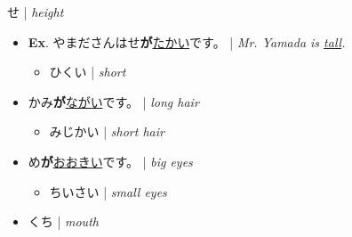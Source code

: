 \documentclass{article}
\begin{document}
\begin{CJK}{UTF8}{min}
せ | \textit{height}

\begin{itemize}
\item \textbf{Ex}. やまださんはせ\textbf{が}\uline{たかい}です。 | \textit{Mr. Yamada is \uline{tall}.}
\begin{itemize}
\item ひくい | \textit{short}
\end{itemize}
\item かみ\textbf{が}\uline{ながい}です。 | \textit{long hair}
\begin{itemize}
\item みじかい | \textit{short hair}
\end{itemize}
\item め\textbf{が}\uline{おおきい}です。 | \textit{big eyes}
\begin{itemize}
\item ちいさい | \textit{small eyes}
\end{itemize}
\item くち | \textit{mouth}
\end{itemize}
















\end{CJK}
\end{document}
